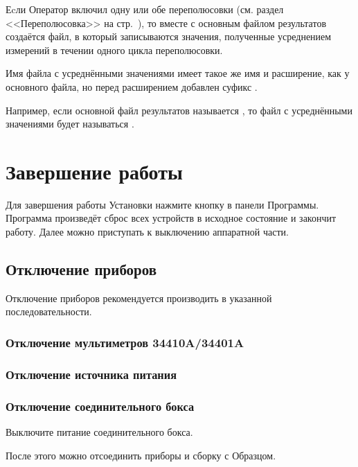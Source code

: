 \documentclass[12pt, a4paper, twocolumn]{report}
\begin{document}
Еcли Оператор включил одну или обе переполюсовки (см. раздел <<Переполюсовка>> на стр.~\pageref{sec_switch}), то вместе с основным файлом результатов создаётся файл, в который записываются значения, полученные усреднением измерений в течении одного цикла переполюсовки.

Имя файла с усреднёнными значениями имеет такое же имя и расширение, как у основного файла, но перед расширением добавлен суфикс .

Например, если основной файл результатов называется , то файл с усреднёнными значениями будет называться .

\chapter{Завершение работы}

Для завершения работы Установки нажмите кнопку  в панели Программы. Программа произведёт сброс всех устройств в исходное состояние и закончит работу. Далее можно приступать к выключению аппаратной части.

\section{Отключение приборов}

Отключение приборов рекомендуется производить в указанной последовательности.

\subsection{Отключение мультиметров 34410A/34401A}



\subsection{Отключение источника питания}



\subsection{Отключение соединительного бокса}

Выключите питание соединительного бокса.

\bigskip

После этого можно отсоединить приборы и сборку с Образцом.
\end{document}
